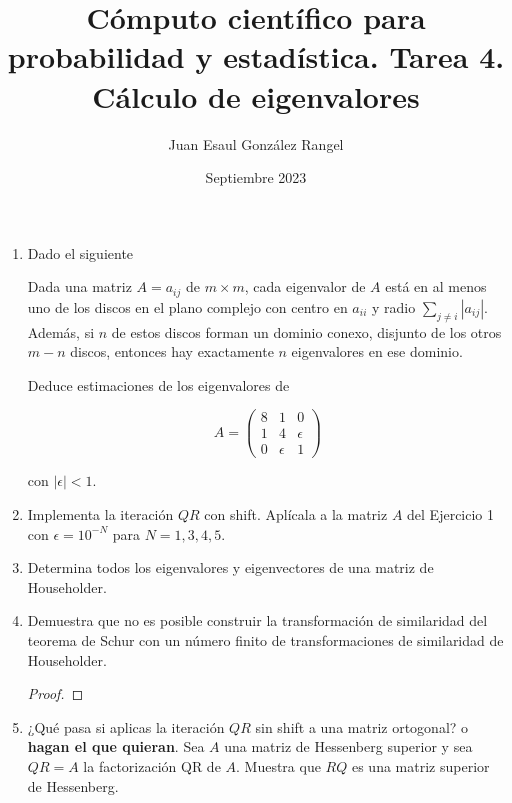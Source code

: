 \documentclass{article}
\title{Cómputo científico para probabilidad y estadística. Tarea 4.\\
Cálculo de eigenvalores}
\author{Juan Esaul González Rangel}
\date{Septiembre 2023}
\begin{document}
\maketitle


\begin{enumerate}

    \item Dado el siguiente

    \begin{theorem}[Gershgorin]
    Dada una matriz $A = a_{ij}$ de $m \times m$, cada eigenvalor de $A$ está en al 
    menos uno de los discos en el plano complejo con centro en $a_{ii}$ y radio 
    $\sum_{j\neq i} |a_{ij}|$. Además, si $n$ de estos discos forman un dominio conexo, 
    disjunto de los otros $m - n$ discos, entonces hay exactamente $n$ eigenvalores 
    en ese dominio.
    \end{theorem}

    Deduce estimaciones de los eigenvalores de

    \[ A = \begin{pmatrix}
        8 & 1 & 0 \\
        1 & 4 & \epsilon \\
        0 & \epsilon & 1
    \end{pmatrix} \]



con $|\epsilon| < 1$.

    \item Implementa la iteración $QR$ con shift. Aplícala a la matriz $A$ del 
    Ejercicio 1 con $\epsilon = 10^{-N}$ para $N = 1, 3, 4, 5$.

    \item Determina todos los eigenvalores y eigenvectores de una matriz de Householder.

    \item Demuestra que no es posible construir la transformación de similaridad del 
    teorema de Schur con un número finito de transformaciones de similaridad de 
    Householder.

    \begin{proof}
        
    \end{proof}

    \item ¿Qué pasa si aplicas la iteración $QR$ sin shift a una matriz ortogonal? 
    o \textbf{hagan el que quieran}. Sea $A$ una matriz de Hessenberg superior y sea $QR = A$ 
    la factorización QR de $A$. Muestra que $RQ$ es una matriz superior de Hessenberg.
   
\end{enumerate}




 
\end{document}
